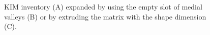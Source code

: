 \begin{figure}
\centering
{}
\caption{KIM inventory (A) expanded by using the empty slot of medial valleys (B) or by extruding the matrix with the shape dimension (C).}
\label{fig213}\end{figure}


